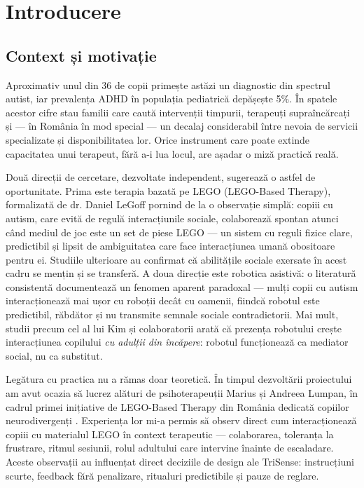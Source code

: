 \chapter{Introducere}
\label{cap:introducere}

\section{Context și motivație}

Aproximativ unul din 36 de copii primește astăzi un diagnostic din spectrul autist, iar prevalența ADHD în populația pediatrică depășește 5\%. În spatele acestor cifre stau familii care caută intervenții timpurii, terapeuți supraîncărcați și — în România în mod special — un decalaj considerabil între nevoia de servicii specializate și disponibilitatea lor. Orice instrument care poate extinde capacitatea unui terapeut, fără a-i lua locul, are așadar o miză practică reală.

Două direcții de cercetare, dezvoltate independent, sugerează o astfel de oportunitate. Prima este terapia bazată pe LEGO (LEGO-Based Therapy), formalizată de dr. Daniel LeGoff \cite{legoff2004} pornind de la o observație simplă: copiii cu autism, care evită de regulă interacțiunile sociale, colaborează spontan atunci când mediul de joc este un set de piese LEGO — un sistem cu reguli fizice clare, predictibil și lipsit de ambiguitatea care face interacțiunea umană obositoare pentru ei. Studiile ulterioare \cite{legoff2006, owens2008} au confirmat că abilitățile sociale exersate în acest cadru se mențin și se transferă. A doua direcție este robotica asistivă: o literatură consistentă \cite{scassellati2012, robins2005, cabibihan2013} documentează un fenomen aparent paradoxal — mulți copii cu autism interacționează mai ușor cu roboții decât cu oamenii, fiindcă robotul este predictibil, răbdător și nu transmite semnale sociale contradictorii. Mai mult, studii precum cel al lui Kim și colaboratorii \cite{kim2013} arată că prezența robotului crește interacțiunea copilului \emph{cu adulții din încăpere}: robotul funcționează ca mediator social, nu ca substitut.

Legătura cu practica nu a rămas doar teoretică. În timpul dezvoltării proiectului am avut ocazia să lucrez alături de psihoterapeuții Marius și Andreea Lumpan, în cadrul primei inițiative de LEGO-Based Therapy din România dedicată copiilor neurodivergenți \cite{lumpanagerpres2025}. Experiența lor mi-a permis să observ direct cum interacționează copiii cu materialul LEGO în context terapeutic — colaborarea, toleranța la frustrare, ritmul sesiunii, rolul adultului care intervine înainte de escaladare. Aceste observații au influențat direct deciziile de design ale TriSense: instrucțiuni scurte, feedback fără penalizare, ritualuri predictibile și pauze de reglare.

